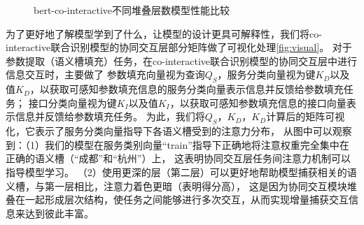 \begin{figure}[htbp]
{  \label{fig:slotF12}
  }
  \caption{bert-co-interactive不同堆叠层数模型性能比较}
  \label{fig:layerCompare}
  \end{figure}

  为了更好地了解模型学到了什么，让模型的设计更具可解释性，我们将co-interactive联合识别模型的协同交互层部分矩阵做了可视化处理\ref{fig:visual}。
  对于参数提取（语义槽填充）任务，在co-interactive联合识别模型的协同交互层中进行信息交互时，主要做了
  参数填充向量视为查询$Q_S$，服务分类向量视为键$K_D$以及值$K_D$，以获取可感知参数填充信息的服务分类向量表示信息并反馈给参数填充任务；
接口分类向量视为键$K_I$以及值$K_I$，以获取可感知参数填充信息的接口向量表示信息并反馈给参数填充任务。
  为此，我们将$Q_S$，$K_D$，$K_D$计算后的矩阵可视化，它表示了服务分类向量指导下各语义槽受到的注意力分布，
  从图中可以观察到：（1）我们的模型在服务类别向量“train”指导下正确地将注意权重完全集中在正确的语义槽（“成都”和“杭州”）上，
  这表明协同交互层任务间注意力机制可以指导模型学习。
  （2）使用更深的层（第二层）可以更好地帮助模型捕获相关的语义槽，与第一层相比，注意力着色更暗（表明得分高），
  这是因为协同交互模块堆叠在一起形成层次结构，使任务之间能够进行多次交互，从而实现增量捕获交互信息来达到彼此丰富。

